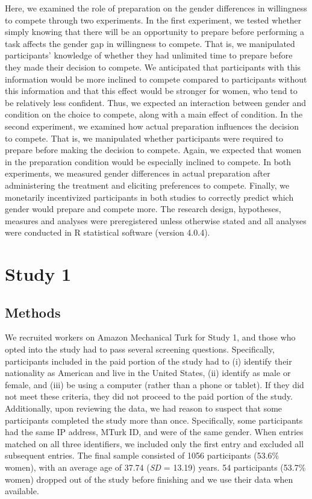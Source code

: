 \documentclass[a4paper, nobind]{templates/ociamthesis}
\begin{document}
Here, we examined the role of preparation on the gender differences in willingness to compete through two experiments. In the first experiment, we tested whether simply knowing that there will be an opportunity to prepare before performing a task affects the gender gap in willingness to compete. That is, we manipulated participants' knowledge of whether they had unlimited time to prepare before they made their decision to compete. We anticipated that participants with this information would be more inclined to compete compared to participants without this information and that this effect would be stronger for women, who tend to be relatively less confident. Thus, we expected an interaction between gender and condition on the choice to compete, along with a main effect of condition. In the second experiment, we examined how actual preparation influences the decision to compete. That is, we manipulated whether participants were required to prepare before making the decision to compete. Again, we expected that women in the preparation condition would be especially inclined to compete. In both experiments, we measured gender differences in actual preparation after administering the treatment and eliciting preferences to compete. Finally, we monetarily incentivized participants in both studies to correctly predict which gender would prepare and compete more. The research design, hypotheses, measures and analyses were preregistered unless otherwise stated and all analyses were conducted in R statistical software (version 4.0.4).

\hypertarget{study-1}{%
\chapter{Study 1}\label{study-1}}

\hypertarget{methods}{%
\section{Methods}\label{methods}}

We recruited workers on Amazon Mechanical Turk for Study 1, and those who opted into the study had to pass several screening questions. Specifically, participants included in the paid portion of the study had to (i) identify their nationality as American and live in the United States, (ii) identify as male or female, and (iii) be using a computer (rather than a phone or tablet). If they did not meet these criteria, they did not proceed to the paid portion of the study. Additionally, upon reviewing the data, we had reason to suspect that some participants completed the study more than once. Specifically, some participants had the same IP address, MTurk ID, and were of the same gender. When entries matched on all three identifiers, we included only the first entry and excluded all subsequent entries. The final sample consisted of 1056 participants (53.6\% women), with an average age of 37.74 (\emph{SD} = 13.19) years. 54 participants (53.7\% women) dropped out of the study before finishing and we use their data when available.
\end{document}
